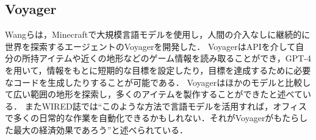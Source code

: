 \subsection{Voyager}
Wangらは，Minecraftで大規模言語モデルを使用し，人間の介入なしに継続的に世界を探索するエージェントのVoyagerを開発した．
VoyagerはAPIを介して自分の所持アイテムや近くの地形などのゲーム情報を読み取ることができ，GPT-4を用いて，情報をもとに短期的な目標を設定したり，目標を達成するために必要なコードを生成したりすることが可能である．
Voyagerはほかのモデルと比較して広い範囲の地形を探索し，多くのアイテムを製作することができたと述べている．
またWIRED誌では``このような方法で言語モデルを活用すれば，オフィスで多くの日常的な作業を自動化できるかもしれない．それがVoyagerがもたらした最大の経済効果であろう''と述べられている．
